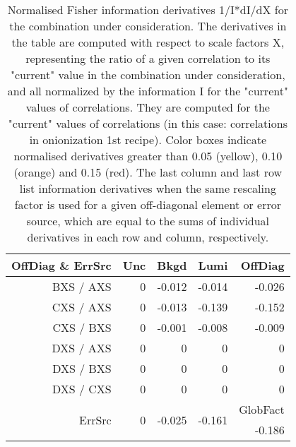 \begin{table}[H]
\scriptsize
\begin{center}
\renewcommand{\arraystretch}{1.1}
\begin{tabular}{|r|rrr|r|}
\hline
 OffDiag \& ErrSrc & {\tiny Unc} & {\tiny Bkgd} & {\tiny Lumi} & OffDiag\\
\hline
BXS / AXS &  0 &     -0.012 &     -0.014 &     -0.026 \\
CXS / AXS &  0 &     -0.013 &     -0.139 &     -0.152 \\
CXS / BXS &  0 &     -0.001 &     -0.008 &     -0.009 \\
DXS / AXS &  0 &  0 &  0 &  0 \\
DXS / BXS &  0 &  0 &  0 &  0 \\
DXS / CXS &  0 &  0 &  0 &  0 \\
\hline
\multirow{2}{*}{ErrSrc} & \multirow{2}{*}{ 0} & \multirow{2}{*}{    -0.025} & \multirow{2}{*}{    -0.161} & GlobFact\\
 & & & &     -0.186 \\
\hline
\end{tabular}
\renewcommand{\arraystretch}{1}
\caption{Normalised Fisher information derivatives 1/I*dI/dX for the combination under consideration. The derivatives in the table are computed with respect to scale factors X, representing the ratio of a given correlation to its "current" value in the combination under consideration, and all normalized by the information I for the "current" values of correlations. They are computed for the "current" values of correlations (in this case: correlations in onionization 1st recipe). Color boxes indicate normalised derivatives greater than 0.05 (yellow), 0.10 (orange) and 0.15 (red). The last column and last row list information derivatives when the same rescaling factor is used for a given off-diagonal element or error source, which are equal to the sums of individual derivatives in each row and column, respectively.}
\end{center}
\end{table}
